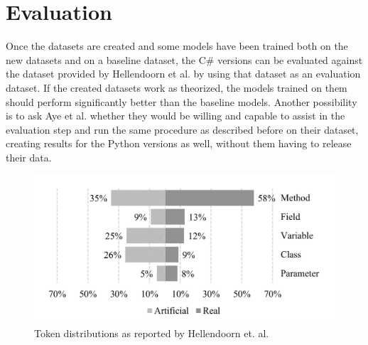 \documentclass[sigplan,screen,9pt]{acmart}
\begin{document}
\section{Evaluation}
Once the datasets are created and some models have been trained both on the
new datasets
and on a baseline dataset, the C\# versions can be evaluated against the dataset provided by Hellendoorn et al.\cite{8812116} by using that dataset as an evaluation dataset.
If the created datasets work as theorized, the models trained on them should perform significantly better than the baseline models.
Another possibility is to ask Aye et al. whether they would be willing and capable to assist in the evaluation step and run the same procedure as described before on their dataset, creating results for the Python versions as well, without them having to release their data.




\begin{figure}
    \centering
    \includegraphics[scale = 0.1]{token-distribution.png}
    \caption{Token distributions as reported by Hellendoorn et. al.\cite{8812116}}
    \label{fig:distributions}
\end{figure}







\end{document}
